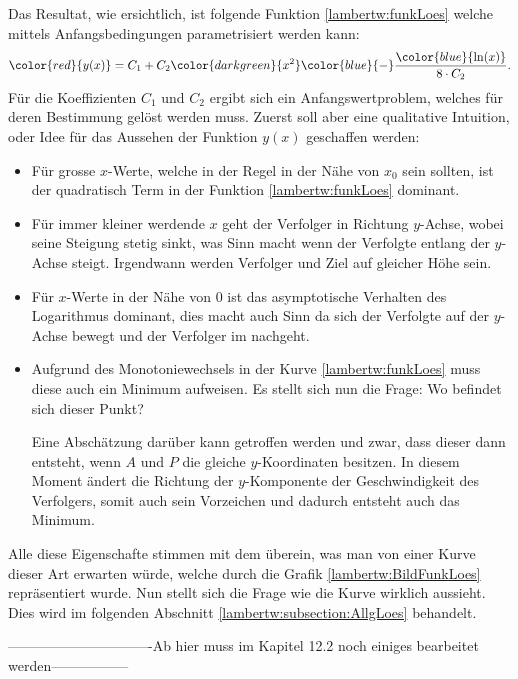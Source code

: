 Das Resultat, wie ersichtlich, ist folgende Funktion \eqref{lambertw:funkLoes} welche mittels Anfangsbedingungen parametrisiert werden kann: 
\begin{equation}
	{\color{red}{y(x)}}
	=
	C_1 + C_2 {\color{darkgreen}{x^2}} {\color{blue}{-}} \frac{\color{blue}{\operatorname{ln}(x)}}{8 \cdot C_2}.
	\label{lambertw:funkLoes}
\end{equation}
Für die Koeffizienten \(C_1\) und \(C_2\) ergibt sich ein Anfangswertproblem, welches für deren Bestimmung gelöst werden muss. Zuerst soll aber eine qualitative Intuition, oder Idee für das Aussehen der Funktion \(y(x)\) geschaffen werden:
\begin{itemize}
	\item
	Für grosse \(x\)-Werte, welche in der Regel in der Nähe von \(x_0\) sein sollten, ist der quadratisch Term in der Funktion \eqref{lambertw:funkLoes} dominant. 
	\item
	Für immer kleiner werdende \(x\) geht der Verfolger in Richtung \(y\)-Achse, wobei seine Steigung stetig sinkt, was Sinn macht wenn der Verfolgte entlang der \(y\)-Achse steigt. Irgendwann werden Verfolger und Ziel auf gleicher Höhe sein.
	\item
	Für \(x\)-Werte in der Nähe von \(0\) ist das asymptotische Verhalten des Logarithmus dominant, dies macht auch Sinn da sich der Verfolgte auf der \(y\)-Achse bewegt und der Verfolger im nachgeht.
	\item
	Aufgrund des Monotoniewechsels in der Kurve \eqref{lambertw:funkLoes} muss diese auch ein Minimum aufweisen. Es stellt sich nun die Frage: Wo befindet sich dieser Punkt? 
	
	Eine Abschätzung darüber kann getroffen werden und zwar, dass dieser dann entsteht, wenn \(A\) und \(P\) die gleiche \(y\)-Koordinaten besitzen. In diesem Moment ändert die Richtung der \(y\)-Komponente der Geschwindigkeit des Verfolgers, somit auch sein Vorzeichen und dadurch entsteht auch das Minimum.
\end{itemize}
Alle diese Eigenschafte stimmen mit dem überein, was man von einer Kurve dieser Art erwarten würde, welche durch die Grafik \ref{lambertw:BildFunkLoes} repräsentiert wurde. Nun stellt sich die Frage wie die Kurve wirklich aussieht. Dies wird im folgenden Abschnitt \ref{lambertw:subsection:AllgLoes} behandelt.

-------------------------------Ab hier muss im Kapitel 12.2 noch einiges bearbeitet werden-----------------
